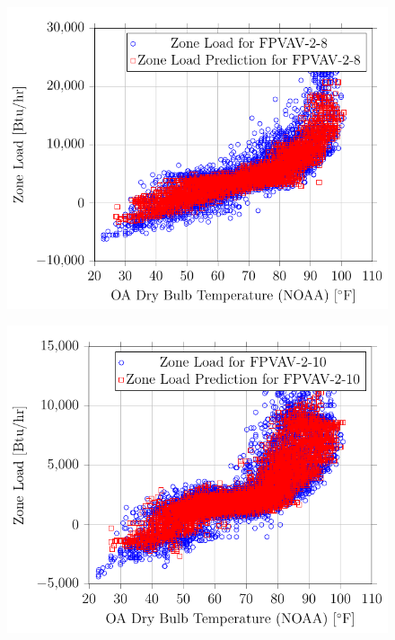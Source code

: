 \begin{figure}
\centering
\includegraphics[]{Plots/19/2017-06-27-1330-BtuhrvsOADryBulbTemperatureNOAAF.pdf}
\caption{}
\label{fig:2017-06-27-1330-BtuhrvsOADryBulbTemperatureNOAAF}
\end{figure}

\begin{figure}
\centering
\includegraphics[]{Plots/20/2017-06-27-1332-BtuhrvsOADryBulbTemperatureNOAAF.pdf}
\caption{}
\label{fig:2017-06-27-1332-BtuhrvsOADryBulbTemperatureNOAAF}
\end{figure}

